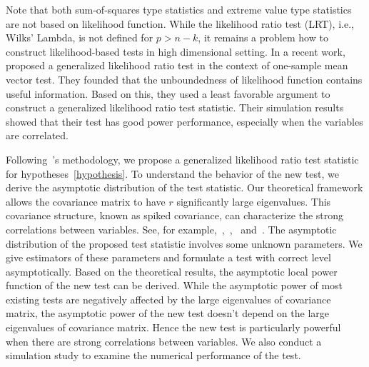 \documentclass[12pt]{article} %
\newcommand{\bfsym}[1]{\ensuremath{\boldsymbol{#1}}}
\def\bSigma {\bfsym {\Sigma}}
\theoremstyle{definition}
\begin{document}
   Note that both sum-of-squares type statistics and extreme value type statistics are not based on likelihood function.
    While the likelihood ratio test (LRT), i.e., Wilks' Lambda, is not defined for $p>n-k$,
    it remains a problem how to construct likelihood-based tests in high dimensional setting.
    In a recent work,~\cite{Zhao2016A} proposed a generalized likelihood ratio test in the context of one-sample mean vector test.
    They founded that the unboundedness of likelihood function contains useful information.
    Based on this, they used a least favorable argument to construct a generalized likelihood ratio test statistic.
    Their simulation results showed that their test has good power performance, especially when the variables are correlated.


    Following~\cite{Zhao2016A}'s methodology, we propose a generalized likelihood ratio test statistic for hypotheses~\eqref{hypothesis}.
    To understand the behavior of the new test, we derive the asymptotic distribution of the test statistic.
    Our theoretical framework allows the covariance matrix to have $r$ significantly large eigenvalues.
    This covariance structure, known as spiked covariance, can characterize the strong correlations between variables. See, for example,~\citet{Fan2008High},~\citet{Cai2012Sparse},~\citet{Shen2013Consistency} and~\citet{Ma2015A}.
    The asymptotic distribution of the proposed test statistic involves some unknown parameters.
    We give estimators of these parameters and formulate a test with correct level asymptotically.
    Based on the theoretical results, the asymptotic local power function of the new test can be derived.
While the asymptotic power of most existing tests are negatively affected by the large eigenvalues of covariance matrix, the asymptotic power of the new test doesn't depend on the large eigenvalues of covariance matrix. 
    Hence the new test is particularly powerful when there are strong correlations between variables.
    We also conduct a simulation study to examine the numerical performance of the test.
\end{document}
